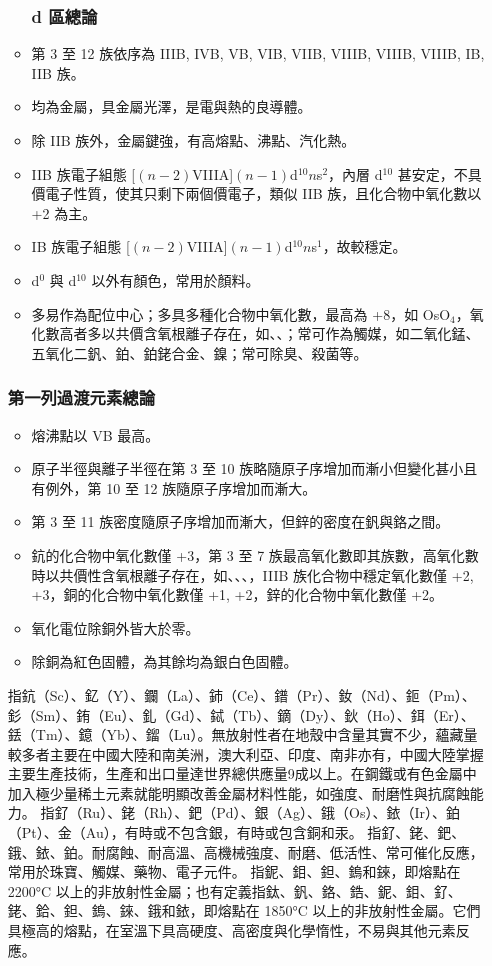 \documentclass[a4paper,12pt]{report}
\begin{document}
\begin{itemize}
\begin{itemize}
\subsubsection{d 區總論}
\item 第 3 至 12 族依序為 IIIB, IVB, VB, VIB, VIIB, VIIIB, VIIIB, VIIIB, IB, IIB 族。
\item 均為金屬，具金屬光澤，是電與熱的良導體。
\item 除 IIB 族外，金屬鍵強，有高熔點、沸點、汽化熱。
\item IIB 族電子組態 [$(n-2)$VIIIA]$(n-1)$d$^{10}n$s$^2$，內層 d$^{10}$ 甚安定，不具價電子性質，使其只剩下兩個價電子，類似 IIB 族，且化合物中氧化數以 +2 為主。
\item IB 族電子組態 [$(n-2)$VIIIA]$(n-1)$d$^{10}n$s$^1$，故較穩定。
\item d$^0$ 與 d$^{10}$ 以外有顏色，常用於顏料。
\item 多易作為配位中心；多具多種化合物中氧化數，最高為 +8，如 OsO$_4$，氧化數高者多以共價含氧根離子存在，如、、；常可作為觸媒，如二氧化錳、五氧化二釩、鉑、鉑銠合金、鎳；常可除臭、殺菌等。
\end{itemize}
\subsubsection{第一列過渡元素總論}
\begin{itemize}
\item 熔沸點以 VB 最高。
\item 原子半徑與離子半徑在第 3 至 10 族略隨原子序增加而漸小但變化甚小且有例外，第 10 至 12 族隨原子序增加而漸大。
\item 第 3 至 11 族密度隨原子序增加而漸大，但鋅的密度在釩與鉻之間。
\item 鈧的化合物中氧化數僅 +3，第 3 至 7 族最高氧化數即其族數，高氧化數時以共價性含氧根離子存在，如、、、，IIIB 族化合物中穩定氧化數僅 +2, +3，銅的化合物中氧化數僅 +1, +2，鋅的化合物中氧化數僅 +2。
\item 氧化電位除銅外皆大於零。
\item 除銅為紅色固體，為其餘均為銀白色固體。
\end{itemize}
指鈧（Sc）、釔（Y）、鑭（La）、鈰（Ce）、鐠（Pr）、釹（Nd）、鉕（Pm）、釤（Sm）、銪（Eu）、釓（Gd）、鋱（Tb）、鏑（Dy）、鈥（Ho）、鉺（Er）、銩（Tm）、鐿（Yb）、鎦（Lu）。無放射性者在地殼中含量其實不少，蘊藏量較多者主要在中國大陸和南美洲，澳大利亞、印度、南非亦有，中國大陸掌握主要生產技術，生產和出口量達世界總供應量9成以上。在鋼鐵或有色金屬中加入極少量稀土元素就能明顯改善金屬材料性能，如強度、耐磨性與抗腐蝕能力。
指釕（Ru）、銠（Rh）、鈀（Pd）、銀（Ag）、鋨（Os）、銥（Ir）、鉑（Pt）、金（Au），有時或不包含銀，有時或包含銅和汞。
指釕、銠、鈀、鋨、銥、鉑。耐腐蝕、耐高溫、高機械強度、耐磨、低活性、常可催化反應，常用於珠寶、觸媒、藥物、電子元件。
指鈮、鉬、鉭、鎢和錸，即熔點在 2200°C 以上的非放射性金屬；也有定義指鈦、釩、鉻、鋯、鈮、鉬、釕、銠、鉿、鉭、鎢、錸、鋨和銥，即熔點在 1850°C 以上的非放射性金屬。它們具極高的熔點，在室溫下具高硬度、高密度與化學惰性，不易與其他元素反應。

\end{itemize}
\end{document}

